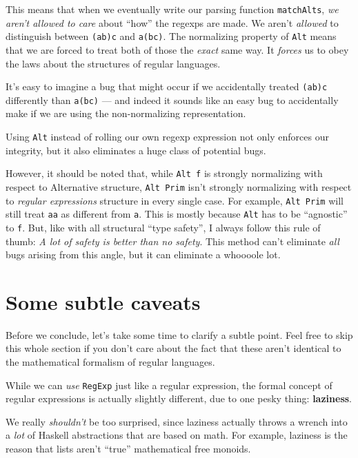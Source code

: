 \documentclass[]{article}
\begin{document}
This means that when we eventually write our parsing function
\texttt{matchAlts}, \emph{we aren't allowed to care} about ``how'' the regexps
are made. We aren't \emph{allowed} to distinguish between
\texttt{(a\textbar{}b)\textbar{}c} and \texttt{a\textbar{}(b\textbar{}c)}. The
normalizing property of \texttt{Alt} means that we are forced to treat both of
those the \emph{exact} same way. It \emph{forces} us to obey the laws about the
structures of regular languages.

It's easy to imagine a bug that might occur if we accidentally treated
\texttt{(a\textbar{}b)\textbar{}c} differently than
\texttt{a\textbar{}(b\textbar{}c)} --- and indeed it sounds like an easy bug to
accidentally make if we are using the non-normalizing representation.

Using \texttt{Alt} instead of rolling our own regexp expression not only
enforces our integrity, but it also eliminates a huge class of potential bugs.

However, it should be noted that, while \texttt{Alt\ f} is strongly normalizing
with respect to Alternative structure, \texttt{Alt\ Prim} isn't strongly
normalizing with respect to \emph{regular expressions} structure in every single
case. For example, \texttt{Alt\ Prim} will still treat \texttt{a\textbar{}a} as
different from \texttt{a}. This is mostly because \texttt{Alt} has to be
``agnostic'' to \texttt{f}. But, like with all structural ``type safety'', I
always follow this rule of thumb: \emph{A lot of safety is better than no
safety}. This method can't eliminate \emph{all} bugs arising from this angle,
but it can eliminate a whoooole lot.

\hypertarget{some-subtle-caveats}{%
\section{Some subtle caveats}\label{some-subtle-caveats}}

Before we conclude, let's take some time to clarify a subtle point. Feel free to
skip this whole section if you don't care about the fact that these aren't
identical to the mathematical formalism of regular languages.

While we can \emph{use} \texttt{RegExp} just like a regular expression, the
formal concept of regular expressions is actually slightly different, due to one
pesky thing: \textbf{laziness}.

We really \emph{shouldn't} be too surprised, since laziness actually throws a
wrench into a \emph{lot} of Haskell abstractions that are based on math. For
example, laziness is the reason that lists aren't ``true'' mathematical free
monoids.
\end{document}
